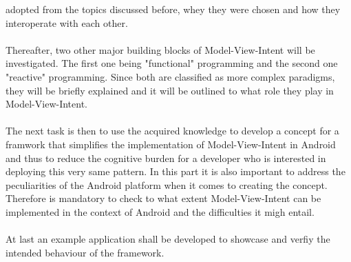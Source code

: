 adopted from the topics discussed before, whey they were chosen and how they interoperate with each other.
\\
\\
Thereafter, two other major building blocks of Model-View-Intent will be investigated. The first one being "functional" programming and the second one "reactive" programming.
Since both are classified as more complex paradigms, they will be briefly explained and it will be outlined to what role they play in Model-View-Intent.
\\
\\
The next task is then to use the acquired knowledge to develop a concept for a framwork that simplifies the implementation of Model-View-Intent in Android and thus to reduce
the cognitive burden for a developer who is interested in deploying this very same pattern. In this part it is also important to address the peculiarities of the Android platform 
when it comes to creating the concept. Therefore is mandatory to check to what extent Model-View-Intent can be implemented in the context of Android and the difficulties it migh entail.
\\
\\
At last an example application shall be developed to showcase and verfiy the intended behaviour of the framework.